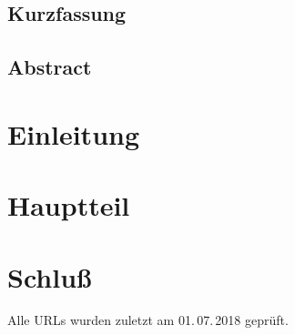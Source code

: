 \documentclass[%
  a4paper,%
  twoside,%
  listof = totoc,%
  bibliography = totoc,%
  headsepline,%
  cleardoublepage = empty,%
  parskip = half,%
  numbers=noenddot%
]{scrbook}
\begin{document}
\Titelblatt

\pagestyle{preamble}
\renewcommand*{\chapterpagestyle}{preamble}
\section*{Kurzfassung}
\lipsum

\section*{Abstract}
\lipsum

\foreignlanguage{english}{}

\cleardoublepage

\tableofcontents
\listoffigures
\listoftables

\chapter{Einleitung}
\lipsum\autocite{turing1936}
\chapter{Hauptteil}
\lipsum
\chapter{Schluß}
\lipsum

\clearpage

\printbibliography

Alle URLs wurden zuletzt am 01.\,07.\,2018 geprüft.

\pagestyle{empty}
\renewcommand*{\chapterpagestyle}{empty}
\Versicherung
\end{document}
